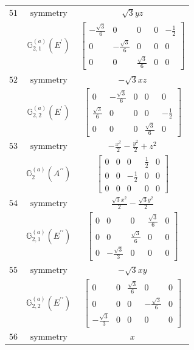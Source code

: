 \documentclass[fleqn,8pt,landscape]{jsarticle}
\begin{document}
\begin{longtable}{ccc}
$ 51 $ & $ \text{symmetry} $ & $ \sqrt{3} y z $ \\
$  $ & $ \mathbb{G}_{2,1}^{(a)}(E^{\prime}) $ & $ \begin{bmatrix} - \frac{\sqrt{3}}{6} & 0 & 0 & 0 & - \frac{1}{2} \\ 0 & - \frac{\sqrt{3}}{6} & 0 & 0 & 0 \\ 0 & 0 & \frac{\sqrt{3}}{6} & 0 & 0 \end{bmatrix} $ \\ \hline
$ 52 $ & $ \text{symmetry} $ & $ - \sqrt{3} x z $ \\
$  $ & $ \mathbb{G}_{2,2}^{(a)}(E^{\prime}) $ & $ \begin{bmatrix} 0 & - \frac{\sqrt{3}}{6} & 0 & 0 & 0 \\ \frac{\sqrt{3}}{6} & 0 & 0 & 0 & - \frac{1}{2} \\ 0 & 0 & 0 & \frac{\sqrt{3}}{6} & 0 \end{bmatrix} $ \\ \hline
$ 53 $ & $ \text{symmetry} $ & $ - \frac{x^{2}}{2} - \frac{y^{2}}{2} + z^{2} $ \\
$  $ & $ \mathbb{G}_{2}^{(a)}(A^{\prime\prime}) $ & $ \begin{bmatrix} 0 & 0 & 0 & \frac{1}{2} & 0 \\ 0 & 0 & - \frac{1}{2} & 0 & 0 \\ 0 & 0 & 0 & 0 & 0 \end{bmatrix} $ \\ \hline
$ 54 $ & $ \text{symmetry} $ & $ \frac{\sqrt{3} x^{2}}{2} - \frac{\sqrt{3} y^{2}}{2} $ \\
$  $ & $ \mathbb{G}_{2,1}^{(a)}(E^{\prime\prime}) $ & $ \begin{bmatrix} 0 & 0 & 0 & \frac{\sqrt{3}}{6} & 0 \\ 0 & 0 & \frac{\sqrt{3}}{6} & 0 & 0 \\ 0 & - \frac{\sqrt{3}}{3} & 0 & 0 & 0 \end{bmatrix} $ \\ \hline
$ 55 $ & $ \text{symmetry} $ & $ - \sqrt{3} x y $ \\
$  $ & $ \mathbb{G}_{2,2}^{(a)}(E^{\prime\prime}) $ & $ \begin{bmatrix} 0 & 0 & \frac{\sqrt{3}}{6} & 0 & 0 \\ 0 & 0 & 0 & - \frac{\sqrt{3}}{6} & 0 \\ - \frac{\sqrt{3}}{3} & 0 & 0 & 0 & 0 \end{bmatrix} $ \\ \hline
$ 56 $ & $ \text{symmetry} $ & $ x $ \\

\end{longtable}
\end{document}
